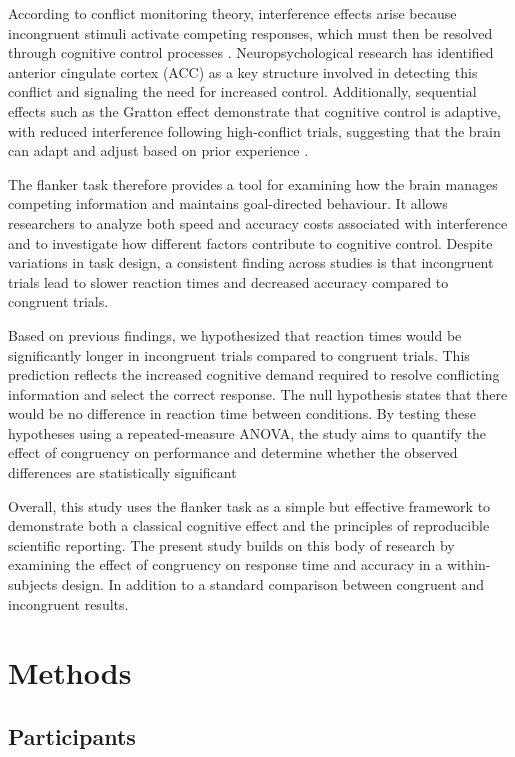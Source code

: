 \documentclass[
  authoryear,
  preprint]{elsarticle}
\begin{document}
According to conflict monitoring theory, interference effects arise
because incongruent stimuli activate competing responses, which must
then be resolved through cognitive control processes
\citep{botvinick2001}. Neuropsychological research has identified
anterior cingulate cortex (ACC) as a key structure involved in detecting
this conflict and signaling the need for increased control.
Additionally, sequential effects such as the Gratton effect demonstrate
that cognitive control is adaptive, with reduced interference following
high-conflict trials, suggesting that the brain can adapt and adjust
based on prior experience \citep{gratton1992}.

The flanker task therefore provides a tool for examining how the brain
manages competing information and maintains goal-directed behaviour. It
allows researchers to analyze both speed and accuracy costs associated
with interference and to investigate how different factors contribute to
cognitive control. Despite variations in task design, a consistent
finding across studies is that incongruent trials lead to slower
reaction times and decreased accuracy compared to congruent trials.

Based on previous findings, we hypothesized that reaction times would be
significantly longer in incongruent trials compared to congruent trials.
This prediction reflects the increased cognitive demand required to
resolve conflicting information and select the correct response. The
null hypothesis states that there would be no difference in reaction
time between conditions. By testing these hypotheses using a
repeated-measure ANOVA, the study aims to quantify the effect of
congruency on performance and determine whether the observed differences
are statistically significant

Overall, this study uses the flanker task as a simple but effective
framework to demonstrate both a classical cognitive effect and the
principles of reproducible scientific reporting. The present study
builds on this body of research by examining the effect of congruency on
response time and accuracy in a within-subjects design. In addition to a
standard comparison between congruent and incongruent results.

\section{Methods}\label{methods}

\subsection{Participants}\label{participants}
\end{document}
